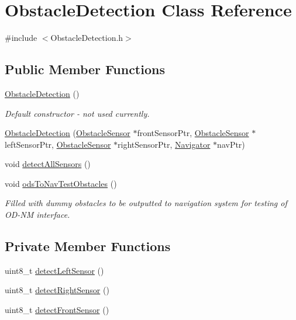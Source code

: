 \hypertarget{class_obstacle_detection}{}\section{Obstacle\+Detection Class Reference}
\label{class_obstacle_detection}


{\ttfamily \#include $<$Obstacle\+Detection.\+h$>$}

\subsection*{Public Member Functions}
\begin{DoxyCompactItemize}
\item 
\mbox{\hyperlink{class_obstacle_detection_a1ef460cae951b0ddaa04088645109f47}{Obstacle\+Detection}} ()
\begin{DoxyCompactList}\small\item\em Default constructor -\/ not used currently. \end{DoxyCompactList}\item 
\mbox{\hyperlink{class_obstacle_detection_ab70842be18c993b94612f17b653f3674}{Obstacle\+Detection}} (\mbox{\hyperlink{class_obstacle_sensor}{Obstacle\+Sensor}} $\ast$front\+Sensor\+Ptr, \mbox{\hyperlink{class_obstacle_sensor}{Obstacle\+Sensor}} $\ast$left\+Sensor\+Ptr, \mbox{\hyperlink{class_obstacle_sensor}{Obstacle\+Sensor}} $\ast$right\+Sensor\+Ptr, \mbox{\hyperlink{class_navigator}{Navigator}} $\ast$nav\+Ptr)
\item 
void \mbox{\hyperlink{class_obstacle_detection_afe8d20425157946ba8e562d9696fef86}{detect\+All\+Sensors}} ()
\item 
void \mbox{\hyperlink{class_obstacle_detection_a4977cf4929ce5b8ec1b42353df9bd2b7}{ods\+To\+Nav\+Test\+Obstacles}} ()
\begin{DoxyCompactList}\small\item\em Filled with dummy obstacles to be outputted to navigation system for testing of O\+D-\/\+NM interface. \end{DoxyCompactList}\end{DoxyCompactItemize}
\subsection*{Private Member Functions}
\begin{DoxyCompactItemize}
\item 
uint8\+\_\+t \mbox{\hyperlink{class_obstacle_detection_adbb2c4295e35c5c4c2b63aed42588bd0}{detect\+Left\+Sensor}} ()
\item 
uint8\+\_\+t \mbox{\hyperlink{class_obstacle_detection_a135adf6077c8af44e33e6814ad7ee9f0}{detect\+Right\+Sensor}} ()
\item 
uint8\+\_\+t \mbox{\hyperlink{class_obstacle_detection_aa7974520bcbaa2d10254fb498347b8c3}{detect\+Front\+Sensor}} ()
\end{DoxyCompactItemize}
